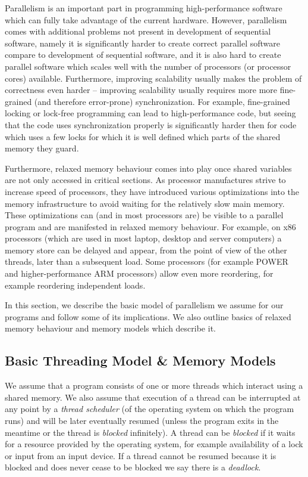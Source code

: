 Parallelism is an important part in programming high-performance software which
can fully take advantage of the current hardware.
However, parallelism comes with additional problems not present in development
of sequential software, namely it is significantly harder to create correct
parallel software compare to development of sequential software, and it is also
hard to create parallel software which scales well with the number of processors
(or processor cores) available.
Furthermore, improving scalability usually makes the problem of correctness even
harder -- improving scalability usually requires more more fine-grained (and
therefore error-prone) synchronization.
For example, fine-grained locking or lock-free programming can lead to
high-performance code, but seeing that the code uses synchronization properly
is significantly harder then for code which uses a few locks for which it is
well defined which parts of the shared memory they guard.

Furthermore, relaxed memory behaviour comes into play once shared variables are
not only accessed in critical sections.
As processor manufactures strive to increase speed of processors, they have
introduced various optimizations into the memory infrastructure to avoid
waiting for the relatively slow main memory.
These optimizations can (and in most processors are) be visible to a parallel
program and are manifested in relaxed memory behaviour.
For example, on x86 processors (which are used in most laptop, desktop and
server computers) a memory store can be delayed and appear, from the point of
view of the other threads, later than a subsequent load.
Some processors (for example POWER and higher-performance ARM processors) allow
even more reordering, for example reordering independent loads.

In this section, we describe the basic model of parallelism we assume for our
programs and follow some of its implications.
We also outline basics of relaxed memory behaviour and memory models
which describe it.

\subsection{Basic Threading Model \& Memory Models}

We assume that a program consists of one or more threads which interact using a
shared memory.
We also assume that execution of a thread can be interrupted at any point by a
\emph{thread scheduler} (of the operating system on which the program runs) and
will be later eventually resumed (unless the program exits in the meantime or
the thread is \emph{blocked} infinitely).
A thread can be \emph{blocked} if it waits for a resource provided by the
operating system, for example availability of a lock or input from an input
device.
If a thread cannot be resumed because it is blocked and does never cease to be
blocked we say there is a \emph{deadlock}.

